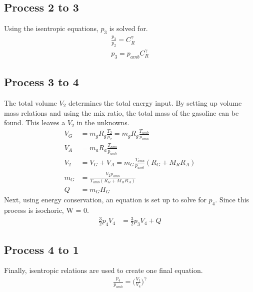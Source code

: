 \documentclass[10pt,a4paper]{article}
\begin{document}
	\subsection*{Process 2 to 3}
	Using the isentropic equations, $p_3$ is solved for.
	\begin{align}
	\frac{p_3}{p_2} = C_R^{\gamma}\\
	p_3 = p_{amb} C_R^{\gamma}
	\end{align}
	\subsection*{Process 3 to 4}
	The total volume $V_2$ determines the total energy input. By setting up volume mass relations and using the mix ratio, the total mass of the gasoline can be found. This leaves a $V_2$ in the unknowns.
	\begin{align}
	V_G &= m_g R_g \frac{T_2}{p_2} = m_g R_g \frac{T_{amb}}{p_{amb}}\\
	V_A &= m_a R_a \frac{T_{amb}}{p_{amb}}\\
	V_2 &= V_G + V_A = m_G \frac{T_{amb}}{p_{amb}} (R_G + M_R R_A)\\
	m_G &= \frac{V_2 p_{amb}}{T_{amb}(R_G + M_R R_A)}\\
	Q &= m_G H_G
	\end{align}
	Next, using energy conservation, an equation is set up to solve for $p_4$. Since this process is isochoric, W = 0.
	\begin{align}
		\frac{3}{2} p_4 V_4 &= \frac{3}{2} p_3 V_4 + Q
	\end{align}
	\subsection*{Process 4 to 1}
	Finally, isentropic relations are used to create one final equation.
	\begin{align}
		\frac{p_4}{p_{amb}} = \Big( \frac{V_1}{V_4} \Big)^{\gamma}
	\end{align}
\end{document}
